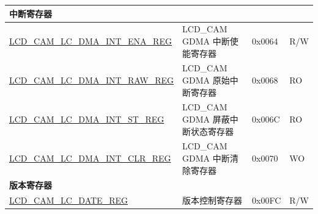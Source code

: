 \begin{longtable}{ | p{6.4cm} | p{6.8cm} | p{1.3cm} | p{1cm} | }
\multicolumn{4}{|l|}{\textbf{中断寄存器}} \\ \hline
\hyperref[regdesc:LCDCAMLCDMAINTENAREG]{LCD\_CAM\_LC\_DMA\_INT\_ENA\_REG} & LCD\_CAM GDMA 中断使能寄存器 & 0x0064 & R/W \\ \hline
\hyperref[regdesc:LCDCAMLCDMAINTRAWREG]{LCD\_CAM\_LC\_DMA\_INT\_RAW\_REG} & LCD\_CAM GDMA 原始中断寄存器 & 0x0068 & RO \\ \hline
\hyperref[regdesc:LCDCAMLCDMAINTSTREG]{LCD\_CAM\_LC\_DMA\_INT\_ST\_REG} & LCD\_CAM GDMA 屏蔽中断状态寄存器 & 0x006C & RO \\ \hline
\hyperref[regdesc:LCDCAMLCDMAINTCLRREG]{LCD\_CAM\_LC\_DMA\_INT\_CLR\_REG} & LCD\_CAM GDMA 中断清除寄存器 & 0x0070 & WO \\ \hline
\multicolumn{4}{|l|}{\textbf{版本寄存器}} \\ \hline
\hyperref[regdesc:LCDCAMLCREGDATEREG]{LCD\_CAM\_LC\_DATE\_REG} & 版本控制寄存器 & 0x00FC & R/W \\ \hline
\end{longtable}
